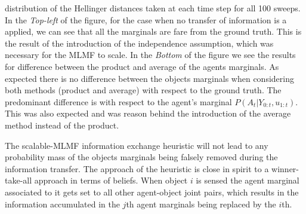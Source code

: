distribution of the Hellinger distances taken at each time step for all 100 sweeps. In the \textit{Top-left} of the figure, 
for the case when no transfer of information is a applied, we can see that all the marginals are fare from the 
ground truth. This is the result of the introduction of the independence assumption, which was necessary for the MLMF to 
scale. In the \textit{Bottom} of the figure we see the results for difference between the product and average of the agents
marginals. As expected there is no difference between the objects marginals when considering both methods (product and average) with respect
to the ground truth. The predominant difference is with respect to the agent's marginal $P(A_t|Y_{0:t},u_{1:t})$. This was also expected and 
was reason behind the introduction of the average method instead of the product. 

The scalable-MLMF information exchange heuristic will not lead to any probability mass of the objects marginals being falsely  
removed during the information transfer. The approach of the heuristic is close in spirit to a winner-take-all approach in terms of beliefs.
When object $i$ is sensed the agent marginal associated to it gets set to all other agent-object joint pairs, which results in the 
information accumulated in the $j$th agent marginals being replaced by the $i$th.

